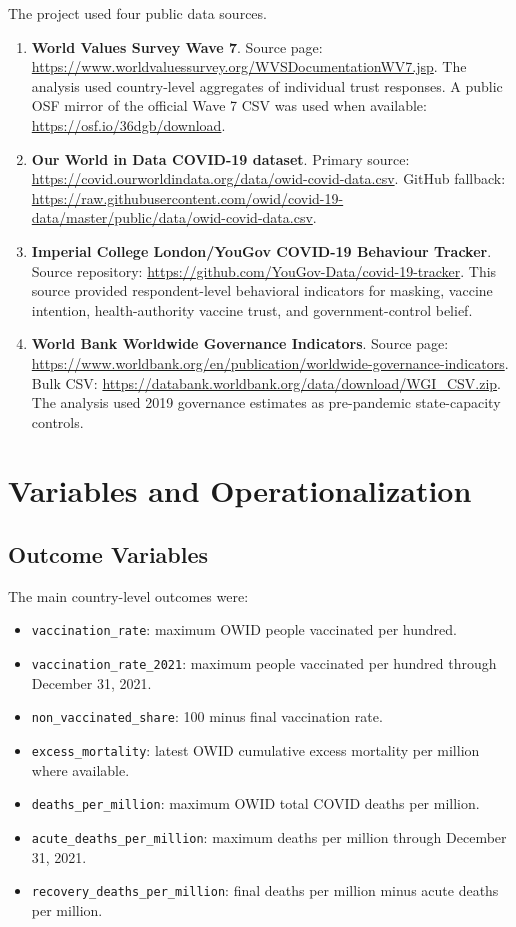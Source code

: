 \documentclass[12pt]{article}
\begin{document}
The project used four public data sources.

\begin{enumerate}
  \item \textbf{World Values Survey Wave 7}. Source page: \url{https://www.worldvaluessurvey.org/WVSDocumentationWV7.jsp}. The analysis used country-level aggregates of individual trust responses. A public OSF mirror of the official Wave 7 CSV was used when available: \url{https://osf.io/36dgb/download}.
  \item \textbf{Our World in Data COVID-19 dataset}. Primary source: \url{https://covid.ourworldindata.org/data/owid-covid-data.csv}. GitHub fallback: \url{https://raw.githubusercontent.com/owid/covid-19-data/master/public/data/owid-covid-data.csv}.
  \item \textbf{Imperial College London/YouGov COVID-19 Behaviour Tracker}. Source repository: \url{https://github.com/YouGov-Data/covid-19-tracker}. This source provided respondent-level behavioral indicators for masking, vaccine intention, health-authority vaccine trust, and government-control belief.
  \item \textbf{World Bank Worldwide Governance Indicators}. Source page: \url{https://www.worldbank.org/en/publication/worldwide-governance-indicators}. Bulk CSV: \url{https://databank.worldbank.org/data/download/WGI_CSV.zip}. The analysis used 2019 governance estimates as pre-pandemic state-capacity controls.
\end{enumerate}

\section{Variables and Operationalization}

\subsection{Outcome Variables}

The main country-level outcomes were:

\begin{itemize}
  \item \texttt{vaccination\_rate}: maximum OWID people vaccinated per hundred.
  \item \texttt{vaccination\_rate\_2021}: maximum people vaccinated per hundred through December 31, 2021.
  \item \texttt{non\_vaccinated\_share}: 100 minus final vaccination rate.
  \item \texttt{excess\_mortality}: latest OWID cumulative excess mortality per million where available.
  \item \texttt{deaths\_per\_million}: maximum OWID total COVID deaths per million.
  \item \texttt{acute\_deaths\_per\_million}: maximum deaths per million through December 31, 2021.
  \item \texttt{recovery\_deaths\_per\_million}: final deaths per million minus acute deaths per million.
\end{itemize}
\end{document}
